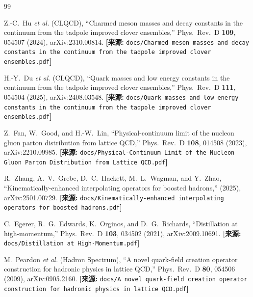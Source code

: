 \documentclass[12pt,a4paper]{ctexart}
\theoremstyle{definition}
\begin{document}
\begin{thebibliography}{99}

Z.-C.~Hu \textit{et al.} (CLQCD),
``Charmed meson masses and decay constants in the continuum from the tadpole improved clover ensembles,''
Phys.\ Rev.\ D \textbf{109}, 054507 (2024), arXiv:2310.00814.
\quad\textbf{[来源:} \texttt{docs/Charmed meson masses and decay constants in the continuum from the tadpole improved clover ensembles.pdf}\textbf{]}

H.-Y.~Du \textit{et al.} (CLQCD),
``Quark masses and low energy constants in the continuum from the tadpole improved clover ensembles,''
Phys.\ Rev.\ D \textbf{111}, 054504 (2025), arXiv:2408.03548.
\quad\textbf{[来源:} \texttt{docs/Quark masses and low energy constants in the continuum from the tadpole improved clover ensembles.pdf}\textbf{]}

Z.~Fan, W.~Good, and H.-W.~Lin,
``Physical-continuum limit of the nucleon gluon parton distribution from lattice QCD,''
Phys.\ Rev.\ D \textbf{108}, 014508 (2023), arXiv:2210.09985.
\quad\textbf{[来源:} \texttt{docs/Physical-Continuum Limit of the Nucleon Gluon Parton Distribution from Lattice QCD.pdf}\textbf{]}

R.~Zhang, A.~V.~Grebe, D.~C.~Hackett, M.~L.~Wagman, and Y.~Zhao,
``Kinematically-enhanced interpolating operators for boosted hadrons,''
(2025), arXiv:2501.00729.
\quad\textbf{[来源:} \texttt{docs/Kinematically-enhanced interpolating operators for boosted hadrons.pdf}\textbf{]}

C.~Egerer, R.~G.~Edwards, K.~Orginos, and D.~G.~Richards,
``Distillation at high-momentum,''
Phys.\ Rev.\ D \textbf{103}, 034502 (2021), arXiv:2009.10691.
\quad\textbf{[来源:} \texttt{docs/Distillation at High-Momentum.pdf}\textbf{]}

M.~Peardon \textit{et al.} (Hadron Spectrum),
``A novel quark-field creation operator construction for hadronic physics in lattice QCD,''
Phys.\ Rev.\ D \textbf{80}, 054506 (2009), arXiv:0905.2160.
\quad\textbf{[来源:} \texttt{docs/A novel quark-field creation operator construction for hadronic physics in lattice QCD.pdf}\textbf{]}

\end{thebibliography}
\end{document}

